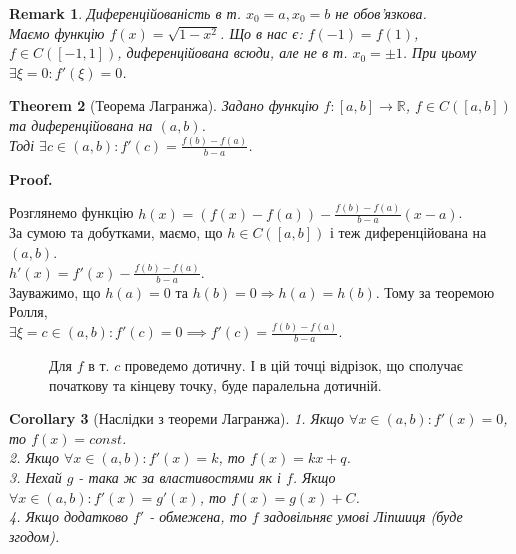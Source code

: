 \documentclass[a4paper, 14pt]{article}
\makeatletter
\def\qed{$\blacksquare$}
\theoremstyle{theoremdd}
\newtheorem{theorem}{Theorem}[subsection]
\theoremstyle{theoremdd}
\theoremstyle{theoremdd}
\theoremstyle{theoremdd}
\theoremstyle{theoremdd}
\theoremstyle{theoremdd}
\newtheorem{remark}[theorem]{Remark}
\theoremstyle{theoremdd}
\theoremstyle{theoremdd}
\newtheorem{corollary}[theorem]{Corollary}
\renewenvironment{proof}[1][Proof.\\]{\par
\pushQED{\hfill \qed}%
\normalfont \topsep6\p@\@plus6\p@\relax
\trivlist
\item\relax
{\bfseries
#1\@addpunct{.}}\hspace\labelsep\ignorespaces
}{%
\popQED\endtrivlist\@endpefalse
}
\makeatother
\begin{document}
\begin{remark}
Диференційованість в т. $x_0=a,x_0=b$ не обов'язкова.\\
Маємо функцію $f(x) = \sqrt{1-x^2}$. Що в нас є: $f(-1) = f(1)$, $f \in C([-1,1])$, диференційована всюди, але не в т. $x_0 = \pm 1$. При цьому $\exists \xi = 0: f'(\xi) = 0$.
\end{remark}

\begin{theorem}[Теорема Лагранжа]
Задано функцію $f: [a,b] \to \mathbb{R}$, $f \in C([a,b])$ та диференційована на $(a,b)$. \\ Тоді $\exists c \in (a,b): f'(c) = \displaystyle \frac{f(b)-f(a)}{b-a}$.
\end{theorem}

\begin{proof}
Розглянемо функцію $h(x) = \displaystyle (f(x)-f(a))- \frac{f(b)-f(a)}{b-a}(x-a)$.\\
За сумою та добутками, маємо, що $h \in C([a,b])$ і теж диференційована на $(a,b)$.\\
$h'(x) = \displaystyle f'(x) - \frac{f(b)-f(a)}{b-a}$.\\
Зауважимо, що $h(a) = 0$ та $h(b) = 0 \Rightarrow h(a) = h(b)$. Тому за теоремою Ролля, \\
$\exists \xi = c \in (a,b): f'(c) = 0 \implies f'(c) = \displaystyle \frac{f(b)-f(a)}{b-a}$.
\end{proof}

\begin{figure}[H]
\centering
{}
\caption*{Для $f$ в т. $c$ проведемо дотичну. І в цій точці відрізок, що сполучає початкову та кінцеву точку, буде паралельна дотичній.}
\end{figure}

\begin{corollary}[Наслідки з теореми Лагранжа]
1. Якщо $\forall x \in (a,b): f'(x) = 0$, то $f(x) = const$.\\
2. Якщо $\forall x \in (a,b): f'(x) = k$, то $f(x) = kx + q$.\\
3. Нехай $g$ - така ж за властивостями як і $f$. Якщо $\forall x \in (a,b): f'(x) = g'(x)$, то $f(x) = g(x) + C$.\\
4. Якщо додатково $f'$ - обмежена, то $f$ задовільняє умові Ліпшиця (буде згодом).
\end{corollary}
\end{document}
